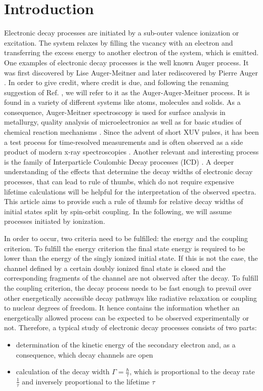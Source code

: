 \section{Introduction}
Electronic decay processes are initiated by a sub-outer valence ionization
or excitation. The system relaxes by filling the vacancy with an electron and
transferring the excess energy to another electron of the system, which is emitted.
One examples of electronic decay processes is the
well known Auger process. It was first discovered
by Lise Auger-Meitner \cite{Meitner22} and later rediscovered
by Pierre Auger \cite{Auger23}. In order to give credit, where credit is due,
and following the renaming suggestion of Ref. \cite{renamingAuger19},
we will refer to it as the Auger-Auger-Meitner process.
It is found in a variety of different systems like atoms, molecules and solids.
As a consequence, Auger-Meitner spectroscopy
is used for surface analysis in metallurgy,
quality analysis of microelectronics
as well as for basic studies of chemical reaction mechanisms \cite{AES_Seah_86}.
Since the advent of short XUV pulses, it has been a test process for
time-resolved measurements \cite{Smirnova03}
and is often observed as a side product of modern x-ray spectroscopies
\cite{Greczynski20}.
Another relevant and interesting process is the family of Interparticle
Coulombic Decay processes (ICD) \cite{Cederbaum97,Hergenhahn11,Jahnke15}.
A deeper understanding of the effects that determine the decay widths
of electronic decay processes, that
can lead to rule of thumbs, which do not require expensive lifetime
calculations will
be helpful for the interpretation of the observed spectra.
This article aims to provide such a rule of thumb for relative decay widths
of initial states split by spin-orbit coupling.
In the following, we will assume processes initiated by ionization.

In order to occur, two criteria need to be fulfilled: the energy and the coupling
criterion.
To fulfill the energy criterion the final state energy is required
to be lower than
the energy of the singly ionized initial state. If this is not the case, the
channel defined by a certain doubly ionized final state
is closed and the corresponding fragments of the
channel are not observed after the decay.
To fulfill the coupling criterion, the decay process needs to be fast enough
to prevail over other energetically accessible decay pathways like radiative
relaxation or coupling to nuclear degrees of freedom.
It hence contains
the information whether an energetically allowed process can be expected
to be observed experimentally or not.
Therefore, a typical study of electronic decay processes consists of two parts:
\begin{itemize}
 \item determination of the kinetic energy of the secondary electron
       and, as a consequence, which decay channels are open
 \item calculation of the decay width $\Gamma=\frac{\hbar}{\tau}$, which
       is proportional to the decay rate $\frac{1}{\tau}$ and
       inversely proportional to the lifetime $\tau$
\end{itemize}


